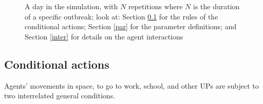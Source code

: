 \documentclass[graybox]{svmult}
\begin{document}
\begin{figure}[t]
\center
{}
\caption{A day in the simulation, with $N$ repetitions where $N$ is the duration of a specific outbreak; look at: Section \ref{cond} for the rules of the conditional actions; Section \ref{par} for the parameter definitions; and Section \ref{inter} for details on the agent interactions}
\label{outline}
\end{figure}


\subsection{Conditional actions}
\label{cond}

Agents' movements in space, to go to work, school, and other UPs are subject to two interrelated general conditions.
\end{document}
